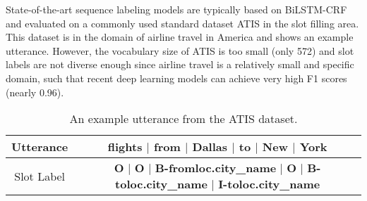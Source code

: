 State-of-the-art sequence labeling models are typically based on 
BiLSTM-CRF \cite{huang2015bidirectional,reimers2017optimal}
and evaluated on a commonly used standard dataset ATIS \cite{price1990evaluation} in the slot filling area.
This dataset is in the domain of airline travel in America and
 shows an example utterance.
However, the vocabulary size of ATIS is too small (only 572)
and slot labels are not diverse enough
since airline travel is a relatively small and specific domain,
such that recent deep learning models can achieve very high F1 scores
(nearly 0.96).
\begin{table}[h]
	\centering
	\small
	\caption{An example utterance from the ATIS dataset.}
	\begin{tabular}{c|c}
		\toprule
		Utterance & flights $|$ from $|$ Dallas $|$ to $|$ New $|$ York \\
		\midrule
		Slot Label & \makecell{\textbf{O} $|$ \textbf{O} $|$ \textbf{B-fromloc.city\_name} $|$ \textbf{O} $|$ \textbf{B-toloc.city\_name} $|$ \\ \textbf{I-toloc.city\_name}}  \\
		\bottomrule
	\end{tabular}
	\label{tab:slot-filling-demo-atis}
\end{table}


